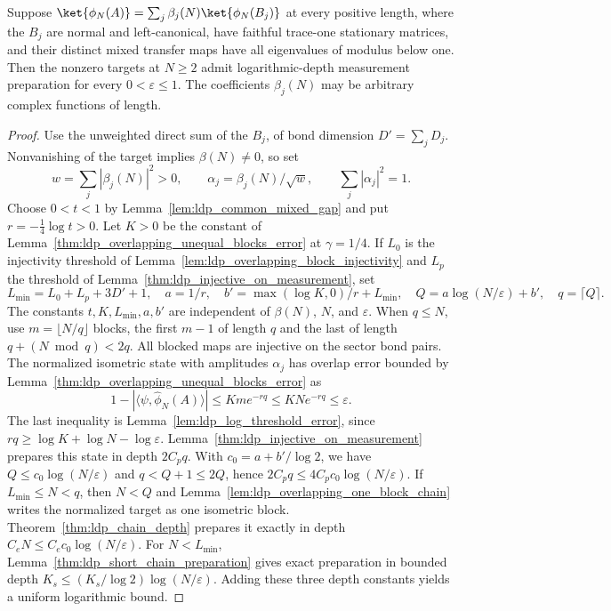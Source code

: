 \begin{lemma}
    \label{lem:ldp_measurement_sector_expansion}
    \leanok
    Suppose $\ket{\phi_N(A)}=\sum_j\beta_j(N)\ket{\phi_N(B_j)}$ at every
    positive length, where the $B_j$ are normal and left-canonical, have
    faithful trace-one stationary matrices, and their distinct mixed transfer
    maps have all eigenvalues of modulus below one. Then the nonzero targets
    at $N\geq2$ admit logarithmic-depth measurement preparation for every
    $0<\varepsilon\leq1$. The coefficients $\beta_j(N)$ may be arbitrary
    complex functions of length.
\end{lemma}
\begin{proof}
    \leanok
    Use the unweighted direct sum of the $B_j$, of bond dimension
    $D'=\sum_j D_j$. Nonvanishing of the target implies $\beta(N)\ne0$, so set
    \[
        w=\sum_j|\beta_j(N)|^2>0,\qquad
        \alpha_j=\beta_j(N)/\sqrt w,\qquad \sum_j|\alpha_j|^2=1.
    \]
    Choose $0<t<1$ by Lemma~\ref{lem:ldp_common_mixed_gap} and put
    $r=-\tfrac14\log t>0$. Let $K>0$ be the constant of
    Lemma~\ref{thm:ldp_overlapping_unequal_blocks_error} at $\gamma=1/4$.
    If $L_0$ is the injectivity threshold of
    Lemma~\ref{lem:ldp_overlapping_block_injectivity} and $L_p$ the threshold
    of Lemma~\ref{thm:ldp_injective_on_measurement}, set
    \[
        L_{\min}=L_0+L_p+3D'+1,\quad a=1/r,\quad
        b'=\max(\log K,0)/r+L_{\min},\quad
        Q=a\log(N/\varepsilon)+b',\quad q=\lceil Q\rceil.
    \]
    The constants $t,K,L_{\min},a,b'$ are independent of $\beta(N)$, $N$, and $\varepsilon$.
    When $q\leq N$, use $m=\lfloor N/q\rfloor$ blocks, the first $m-1$
    of length $q$ and the last of length $q+(N\bmod q)<2q$.
    All blocked maps are injective on the sector bond pairs. The normalized
    isometric state with amplitudes $\alpha_j$ has overlap error bounded by
    Lemma~\ref{thm:ldp_overlapping_unequal_blocks_error} as
    \[
        1-|\langle\psi,\widehat\phi_N(A)\rangle|
        \leq Km e^{-rq}\leq KN e^{-rq}\leq\varepsilon.
    \]
    The last inequality is Lemma~\ref{lem:ldp_log_threshold_error}, since
    $rq\geq\log K+\log N-\log\varepsilon$.
    Lemma~\ref{thm:ldp_injective_on_measurement} prepares this state in
    depth $2C_pq$. With $c_0=a+b'/\log2$, we have
    $Q\leq c_0\log(N/\varepsilon)$ and $q<Q+1\leq2Q$,
    hence $2C_pq\leq4C_pc_0\log(N/\varepsilon)$.
    If $L_{\min}\leq N<q$, then $N<Q$ and
    Lemma~\ref{lem:ldp_overlapping_one_block_chain} writes the normalized
    target as one isometric block. Theorem~\ref{thm:ldp_chain_depth} prepares
    it exactly in depth $C_eN\leq C_ec_0\log(N/\varepsilon)$.
    For $N<L_{\min}$, Lemma~\ref{thm:ldp_short_chain_preparation} gives
    exact preparation in bounded depth $K_s\leq(K_s/\log2)\log(N/\varepsilon)$.
    Adding these three depth constants yields a uniform logarithmic bound.
\end{proof}

